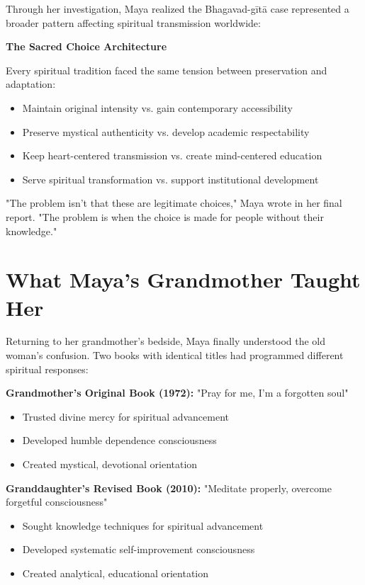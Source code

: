 \documentclass[11pt,twoside]{book}
\begin{document}
Through her investigation, Maya realized the Bhagavad-gītā case represented a broader pattern affecting spiritual transmission worldwide:

\textbf{\textbf{The Sacred Choice Architecture}}

Every spiritual tradition faced the same tension between preservation and adaptation:
\begin{itemize}
\item Maintain original intensity vs. gain contemporary accessibility
\item Preserve mystical authenticity vs. develop academic respectability
\item Keep heart-centered transmission vs. create mind-centered education
\item Serve spiritual transformation vs. support institutional development
\end{itemize}

"The problem isn't that these are legitimate choices," Maya wrote in her final report. "The problem is when the choice is made for people without their knowledge."
\section*{What Maya's Grandmother Taught Her}
\label{sec:org7c36cfb}

Returning to her grandmother's bedside, Maya finally understood the old woman's confusion. Two books with identical titles had programmed different spiritual responses:

\textbf{\textbf{Grandmother's Original Book (1972):}}
"Pray for me, I'm a forgotten soul"
\begin{itemize}
\item Trusted divine mercy for spiritual advancement
\item Developed humble dependence consciousness
\item Created mystical, devotional orientation
\end{itemize}

\textbf{\textbf{Granddaughter's Revised Book (2010):}}
"Meditate properly, overcome forgetful consciousness"  
\begin{itemize}
\item Sought knowledge techniques for spiritual advancement
\item Developed systematic self-improvement consciousness
\item Created analytical, educational orientation
\end{itemize}
\end{document}
